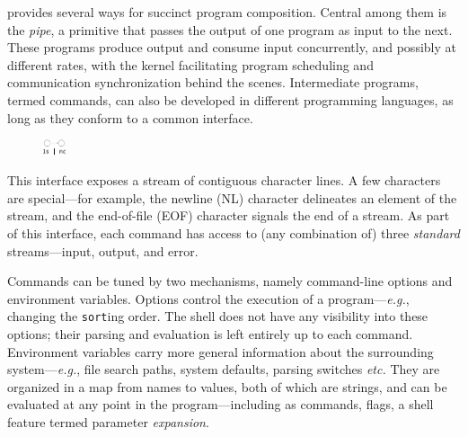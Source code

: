 \documentclass[sigplan,10pt,review,anonymous]{acmart}
\newcommand{\eg}{{\em e.g.}, }
\newcommand{\etc}{{\em etc.}\xspace}
\newcommand{\ttt}[1]{\texttt{\small #1}}
\begin{document}
\unix provides several ways for succinct program composition.
Central among them is the \emph{pipe}, a primitive that passes the output of one program as input to the next.
These programs produce output and consume input concurrently, and possibly at different rates, with the \unix kernel facilitating program scheduling and communication synchronization behind the scenes.
Intermediate programs, termed commands, can also be developed in different programming languages, as long as they conform to a common interface.
\begin{figure}
  \vspace{-12pt}
    \includegraphics[width=0.06\textwidth]{./figs/dish_ex1.pdf}
  \vspace{-30pt}
\end{figure}
This interface exposes a stream of contiguous character lines.
A few characters are special---for example, the newline (\textsc{NL}) character delineates an element of the stream, and the end-of-file (\textsc{EOF}) character signals the end of a stream.
As part of this interface, each command has access to (any combination of) three \emph{standard} streams---input, output, and error.

Commands can be tuned by two mechanisms, namely command-line options and environment variables.
Options control the execution of a program---\eg changing the \ttt{sort}ing order.
The shell does not have any visibility into these options; 
  their parsing and evaluation is left entirely up to each command.
Environment variables carry more general information about the surrounding system---\eg file search paths, system defaults, parsing switches \etc 
They are organized in a map from names to values, both of which are strings, and can be evaluated at any point in the program---including as commands, flags, a shell feature termed parameter \emph{expansion}.
\end{document}
